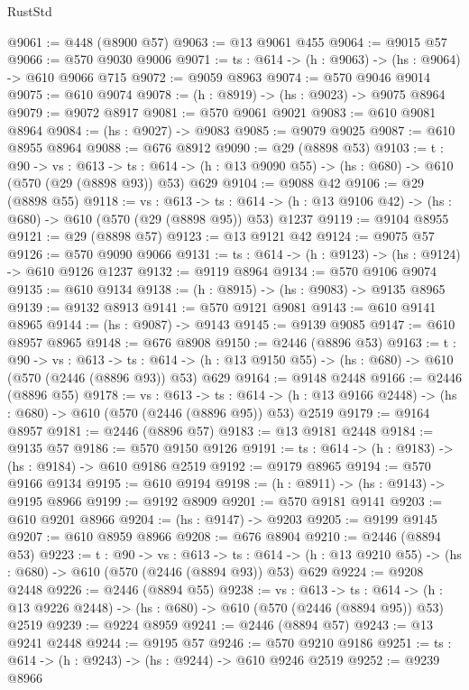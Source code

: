 \begin{lexlean}{RustStd}
\begin{coremodule}
@9061 := @448 (@8900 @57)
@9063 := @13 @9061 @455
@9064 := @9015 @57
@9066 := @570 @9030 @9006
@9071 := {ts : @614} -> (h : @9063) -> (hs : @9064) -> @610 @9066 @715
@9072 := @9059 @8963
@9074 := @570 @9046 @9014
@9075 := @610 @9074
@9078 := (h : @8919) -> (hs : @9023) -> @9075 @8964
@9079 := @9072 @8917
@9081 := @570 @9061 @9021
@9083 := @610 @9081 @8964
@9084 := (hs : @9027) -> @9083
@9085 := @9079 @9025
@9087 := @610 @8955 @8964
@9088 := @676 @8912
@9090 := @29 (@8898 @53)
@9103 := {t : @90} ->
  {vs : @613} ->
  {ts : @614} -> (h : @13 @9090 @55) -> (hs : @680) -> @610 (@570 (@29 (@8898 @93)) @53) @629
@9104 := @9088 @42
@9106 := @29 (@8898 @55)
@9118 := {vs : @613} ->
  {ts : @614} -> (h : @13 @9106 @42) -> (hs : @680) -> @610 (@570 (@29 (@8898 @95)) @53) @1237
@9119 := @9104 @8955
@9121 := @29 (@8898 @57)
@9123 := @13 @9121 @42
@9124 := @9075 @57
@9126 := @570 @9090 @9066
@9131 := {ts : @614} -> (h : @9123) -> (hs : @9124) -> @610 @9126 @1237
@9132 := @9119 @8964
@9134 := @570 @9106 @9074
@9135 := @610 @9134
@9138 := (h : @8915) -> (hs : @9083) -> @9135 @8965
@9139 := @9132 @8913
@9141 := @570 @9121 @9081
@9143 := @610 @9141 @8965
@9144 := (hs : @9087) -> @9143
@9145 := @9139 @9085
@9147 := @610 @8957 @8965
@9148 := @676 @8908
@9150 := @2446 (@8896 @53)
@9163 := {t : @90} ->
  {vs : @613} ->
  {ts : @614} -> (h : @13 @9150 @55) -> (hs : @680) -> @610 (@570 (@2446 (@8896 @93)) @53) @629
@9164 := @9148 @2448
@9166 := @2446 (@8896 @55)
@9178 := {vs : @613} ->
  {ts : @614} -> (h : @13 @9166 @2448) -> (hs : @680) -> @610 (@570 (@2446 (@8896 @95)) @53) @2519
@9179 := @9164 @8957
@9181 := @2446 (@8896 @57)
@9183 := @13 @9181 @2448
@9184 := @9135 @57
@9186 := @570 @9150 @9126
@9191 := {ts : @614} -> (h : @9183) -> (hs : @9184) -> @610 @9186 @2519
@9192 := @9179 @8965
@9194 := @570 @9166 @9134
@9195 := @610 @9194
@9198 := (h : @8911) -> (hs : @9143) -> @9195 @8966
@9199 := @9192 @8909
@9201 := @570 @9181 @9141
@9203 := @610 @9201 @8966
@9204 := (hs : @9147) -> @9203
@9205 := @9199 @9145
@9207 := @610 @8959 @8966
@9208 := @676 @8904
@9210 := @2446 (@8894 @53)
@9223 := {t : @90} ->
  {vs : @613} ->
  {ts : @614} -> (h : @13 @9210 @55) -> (hs : @680) -> @610 (@570 (@2446 (@8894 @93)) @53) @629
@9224 := @9208 @2448
@9226 := @2446 (@8894 @55)
@9238 := {vs : @613} ->
  {ts : @614} -> (h : @13 @9226 @2448) -> (hs : @680) -> @610 (@570 (@2446 (@8894 @95)) @53) @2519
@9239 := @9224 @8959
@9241 := @2446 (@8894 @57)
@9243 := @13 @9241 @2448
@9244 := @9195 @57
@9246 := @570 @9210 @9186
@9251 := {ts : @614} -> (h : @9243) -> (hs : @9244) -> @610 @9246 @2519
@9252 := @9239 @8966

\end{coremodule}
\end{lexlean}
